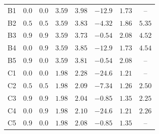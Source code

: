 \documentclass{aa}
\begin{document}
\begin{table}
\begin{tabular}{c c c c  c c c c}
 \hline 
B1 & $0.0$ & $0.0$ & $3.59$ &  $3.98$  & $-12.9$ & $1.73$ & -- \\ 
B2 & $0.5$ & $0.5$ & $3.59$ &  $3.83$  & $-4.32$ & $1.86$ & $5.35$\\ 
B3 & $0.9$ & $0.9$ & $3.59$ &  $3.73$  & $-0.54$ & $2.08$ & $4.52$\\ 
B4 & $0.0$ & $0.9$ & $3.59$ &  $3.85$  & $-12.9$ & $1.73$ & $4.54$\\ 
B5 & $0.9$ & $0.0$ & $3.59$ &  $3.81$  & $-0.54$ & $2.08$ & -- \\  
 \hline 
C1 & $0.0$ & $0.0$ & $1.98$ &  $2.28$  & $-24.6$ & $1.21$ & -- \\ 
C2 & $0.5$ & $0.5$ & $1.98$ &  $2.09$  & $-7.34$ & $1.26$ & $2.50$\\ 
C3 & $0.9$ & $0.9$ & $1.98$ &  $2.04$  & $-0.85$ & $1.35$ & $2.25$\\ 
C4 & $0.0$ & $0.9$ & $1.98$ &  $2.10$  & $-24.6$ & $1.21$ & $2.26$\\ 
C5 & $0.9$ & $0.0$ & $1.98$ &  $2.08$  & $-0.85$ & $1.35$ & --\\ 
\hline      
\end{tabular}
\end{table}
\end{document}

